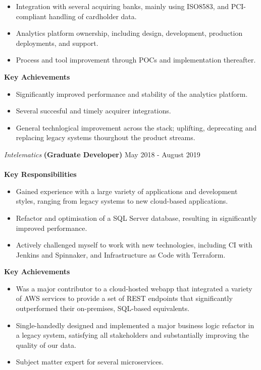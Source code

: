 \documentclass[margin, 11pt]{style}
\begin{document}
\begin{resume}
\begin{itemize}
\item Integration with several acquiring banks, mainly using ISO8583, and PCI-compliant handling of cardholder data.
\item Analytics platform ownership, including design, development, production deployments, and support.
\item Process and tool improvement through POCs and implementation thereafter.

\end{itemize}


\textbf{Key Achievements}

\begin{itemize}
\item Significantly improved performance and stability of the analytics platform.
\item Several succesful and timely acquirer integrations.
\item General technlogical improvement across the stack; uplifting, deprecating and replacing legacy systems thourghout the product streams.

\end{itemize}


{\sl Intelematics} \textbf{(Graduate Developer)} \hfill May 2018 - August 2019 \\
\vspace{15pt}\\
\textbf{Key Responsibilities}

\begin{itemize}
\item Gained experience with a large variety of applications and development styles, ranging from legacy systems to new cloud-based applications.
\item Refactor and optimisation of a SQL Server database, resulting in significantly improved performance.
\item Actively challenged myself to work with new technologies, including CI with Jenkins and Spinnaker, and Infrastructure as Code with Terraform.

\end{itemize}

\textbf{Key Achievements}

\begin{itemize}

\item Was a major contributor to a cloud-hosted webapp that integrated a variety of AWS services to provide a set of REST endpoints that significantly outperformed their on-premises, SQL-based equivalents.
\item Single-handedly designed and implemented a major business logic refactor in a legacy system, satisfying all stakeholders and substantially improving the quality of our data.
\item Subject matter expert for several microservices.



\end{itemize}
\end{resume}
\end{document}

